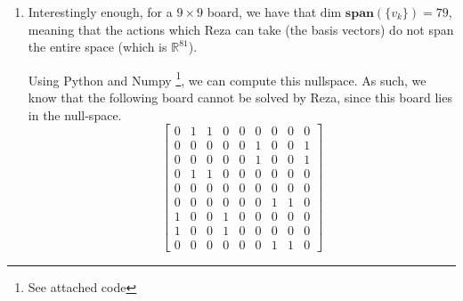 \documentclass[12pt]{exam}
\begin{document}
\begin{questions}
\begin{solution}
\begin{enumerate}[label=(\alph*)]
      \item Interestingly enough, for a $9 \times 9$ board, we have that $\text{dim }\textbf{span}(\{v_k\}) = 79$, meaning that the actions which Reza can take (the basis vectors) do not span the entire space (which is $\mathbb{R}^{81}$). 

      Using Python and Numpy \footnote{See attached code}, we can compute this nullspace. As such, we know that the following board cannot be solved by Reza, since this board lies in the null-space.
      \[
        \begin{bmatrix}
           0 & 1 & 1 & 0 & 0 & 0 & 0 & 0 & 0 \\
           0 & 0 & 0 & 0 & 0 & 1 & 0 & 0 & 1 \\
           0 & 0 & 0 & 0 & 0 & 1 & 0 & 0 & 1 \\
           0 & 1 & 1 & 0 & 0 & 0 & 0 & 0 & 0 \\
           0 & 0 & 0 & 0 & 0 & 0 & 0 & 0 & 0 \\
           0 & 0 & 0 & 0 & 0 & 0 & 1 & 1 & 0 \\
           1 & 0 & 0 & 1 & 0 & 0 & 0 & 0 & 0 \\
           1 & 0 & 0 & 1 & 0 & 0 & 0 & 0 & 0 \\
           0 & 0 & 0 & 0 & 0 & 0 & 1 & 1 & 0
       \end{bmatrix}
      \]
  \end{enumerate}
\end{solution}


\end{questions}


\begin{comment}

{code.pdf}
\end{comment}
\end{document}

